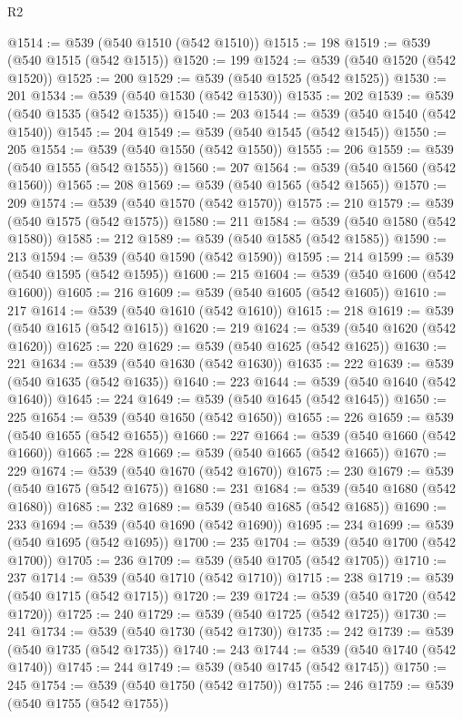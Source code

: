 \begin{lexlean}{R2}
\begin{coremodule}
@1514 := @539 (@540 @1510 (@542 @1510))
@1515 := 198
@1519 := @539 (@540 @1515 (@542 @1515))
@1520 := 199
@1524 := @539 (@540 @1520 (@542 @1520))
@1525 := 200
@1529 := @539 (@540 @1525 (@542 @1525))
@1530 := 201
@1534 := @539 (@540 @1530 (@542 @1530))
@1535 := 202
@1539 := @539 (@540 @1535 (@542 @1535))
@1540 := 203
@1544 := @539 (@540 @1540 (@542 @1540))
@1545 := 204
@1549 := @539 (@540 @1545 (@542 @1545))
@1550 := 205
@1554 := @539 (@540 @1550 (@542 @1550))
@1555 := 206
@1559 := @539 (@540 @1555 (@542 @1555))
@1560 := 207
@1564 := @539 (@540 @1560 (@542 @1560))
@1565 := 208
@1569 := @539 (@540 @1565 (@542 @1565))
@1570 := 209
@1574 := @539 (@540 @1570 (@542 @1570))
@1575 := 210
@1579 := @539 (@540 @1575 (@542 @1575))
@1580 := 211
@1584 := @539 (@540 @1580 (@542 @1580))
@1585 := 212
@1589 := @539 (@540 @1585 (@542 @1585))
@1590 := 213
@1594 := @539 (@540 @1590 (@542 @1590))
@1595 := 214
@1599 := @539 (@540 @1595 (@542 @1595))
@1600 := 215
@1604 := @539 (@540 @1600 (@542 @1600))
@1605 := 216
@1609 := @539 (@540 @1605 (@542 @1605))
@1610 := 217
@1614 := @539 (@540 @1610 (@542 @1610))
@1615 := 218
@1619 := @539 (@540 @1615 (@542 @1615))
@1620 := 219
@1624 := @539 (@540 @1620 (@542 @1620))
@1625 := 220
@1629 := @539 (@540 @1625 (@542 @1625))
@1630 := 221
@1634 := @539 (@540 @1630 (@542 @1630))
@1635 := 222
@1639 := @539 (@540 @1635 (@542 @1635))
@1640 := 223
@1644 := @539 (@540 @1640 (@542 @1640))
@1645 := 224
@1649 := @539 (@540 @1645 (@542 @1645))
@1650 := 225
@1654 := @539 (@540 @1650 (@542 @1650))
@1655 := 226
@1659 := @539 (@540 @1655 (@542 @1655))
@1660 := 227
@1664 := @539 (@540 @1660 (@542 @1660))
@1665 := 228
@1669 := @539 (@540 @1665 (@542 @1665))
@1670 := 229
@1674 := @539 (@540 @1670 (@542 @1670))
@1675 := 230
@1679 := @539 (@540 @1675 (@542 @1675))
@1680 := 231
@1684 := @539 (@540 @1680 (@542 @1680))
@1685 := 232
@1689 := @539 (@540 @1685 (@542 @1685))
@1690 := 233
@1694 := @539 (@540 @1690 (@542 @1690))
@1695 := 234
@1699 := @539 (@540 @1695 (@542 @1695))
@1700 := 235
@1704 := @539 (@540 @1700 (@542 @1700))
@1705 := 236
@1709 := @539 (@540 @1705 (@542 @1705))
@1710 := 237
@1714 := @539 (@540 @1710 (@542 @1710))
@1715 := 238
@1719 := @539 (@540 @1715 (@542 @1715))
@1720 := 239
@1724 := @539 (@540 @1720 (@542 @1720))
@1725 := 240
@1729 := @539 (@540 @1725 (@542 @1725))
@1730 := 241
@1734 := @539 (@540 @1730 (@542 @1730))
@1735 := 242
@1739 := @539 (@540 @1735 (@542 @1735))
@1740 := 243
@1744 := @539 (@540 @1740 (@542 @1740))
@1745 := 244
@1749 := @539 (@540 @1745 (@542 @1745))
@1750 := 245
@1754 := @539 (@540 @1750 (@542 @1750))
@1755 := 246
@1759 := @539 (@540 @1755 (@542 @1755))

\end{coremodule}
\end{lexlean}

